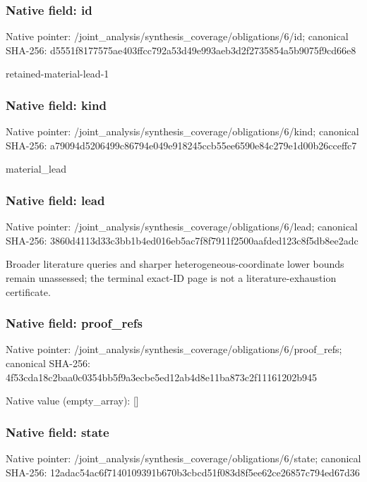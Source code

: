 \documentclass[10pt,a4paper]{article}
\begin{document}
\subsubsection{Native field: id}
Native pointer: /joint\_\allowbreak{}analysis/synthesis\_\allowbreak{}coverage/obligations/6/id; canonical SHA-256: d5551f8177575ae403ffcc792a53d49e993aeb3d2f2735854a5b9075f9cd66e8

\begingroup\raggedright\sloppy retained-material-lead-1\par\endgroup

\subsubsection{Native field: kind}
Native pointer: /joint\_\allowbreak{}analysis/synthesis\_\allowbreak{}coverage/obligations/6/kind; canonical SHA-256: a79094d5206499c86794e049e918245ccb55ee6590e84c279e1d00b26cceffc7

\begingroup\raggedright\sloppy material\_\allowbreak{}lead\par\endgroup

\subsubsection{Native field: lead}
Native pointer: /joint\_\allowbreak{}analysis/synthesis\_\allowbreak{}coverage/obligations/6/lead; canonical SHA-256: 3860d4113d33c3bb1b4ed016eb5ac7f8f7911f2500aafded123c8f5db8ee2adc

\begingroup\raggedright\sloppy Broader literature queries and sharper heterogeneous-coordinate lower bounds remain unassessed;\allowbreak{} the terminal exact-ID page is not a literature-exhaustion certificate.\par\endgroup

\subsubsection{Native field: proof\_\allowbreak{}refs}
Native pointer: /joint\_\allowbreak{}analysis/synthesis\_\allowbreak{}coverage/obligations/6/proof\_\allowbreak{}refs; canonical SHA-256: 4f53cda18c2baa0c0354bb5f9a3ecbe5ed12ab4d8e11ba873c2f11161202b945

Native value (empty\_\allowbreak{}array): []

\subsubsection{Native field: state}
Native pointer: /joint\_\allowbreak{}analysis/synthesis\_\allowbreak{}coverage/obligations/6/state; canonical SHA-256: 12adac54ac6f7140109391b670b3cbcd51f083d8f5ee62ce26857c794ed67d36
\end{document}
